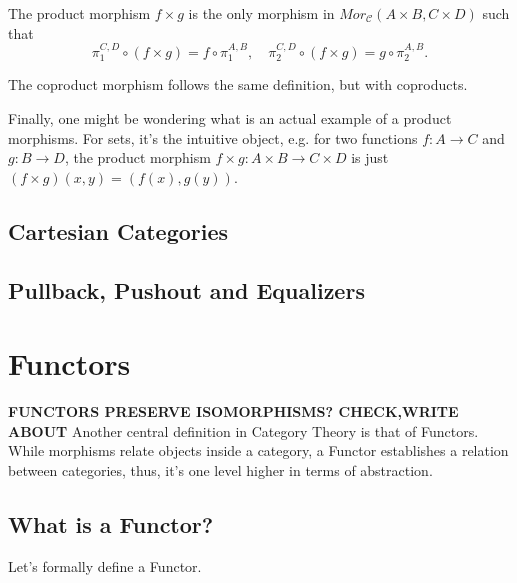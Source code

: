 \begin{theorem}
	The product morphism $f\times g$ is the only morphism in $Mor_\mathcal C (A\times B, C \times D)$
	such that
	\begin{displaymath}
		\pi_1^{C,D} \circ (f\times g) = f \circ \pi_1^{A,B}, \quad
		\pi_2^{C,D} \circ (f\times g) = g \circ \pi_2^{A,B}.
	\end{displaymath}
\end{theorem}

The coproduct morphism follows the same definition, but with coproducts.

Finally, one might be wondering what is an actual example of a product morphisms.
For sets, it's the intuitive object, e.g. for two functions $f:A \to C$
and $g:B \to D$, the product morphism $f\times g:A\times B \to C \times D$
is just $(f\times g) (x,y) = (f(x), g(y))$.

\subsection{Cartesian Categories}

\subsection{Pullback, Pushout and Equalizers}

\section{Functors}

\textbf{FUNCTORS PRESERVE ISOMORPHISMS? CHECK,WRITE ABOUT}
Another central definition in Category Theory is that of Functors.
While morphisms relate objects inside a category, a Functor
establishes a relation between categories, thus, it's one level
higher in terms of abstraction.


\subsection{What is a Functor?}

Let's formally define a Functor.


